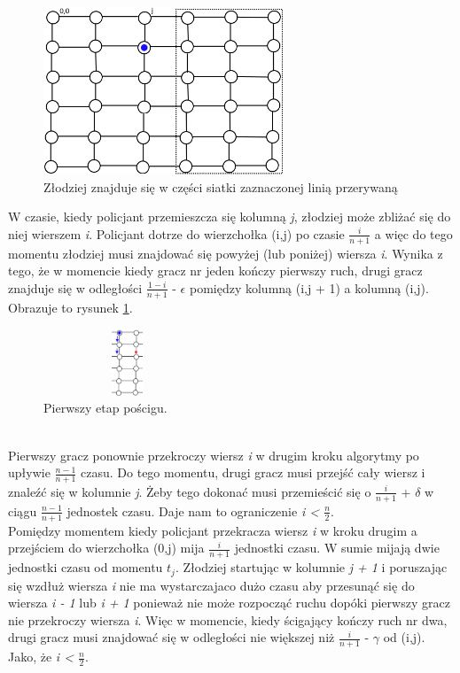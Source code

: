 \documentclass[brudnopis]{xmgr}
\begin{document}
\begin{figure}[ht!]
  \centering
  \includegraphics[height=5cm]{rysunki/podsiatka.png}
  \caption{Złodziej znajduje się w części siatki zaznaczonej linią przerywaną}
\end{figure} 

\indent W czasie, kiedy policjant przemieszcza się kolumną \textit{j}, złodziej może zbliżać się do niej wierszem \textit{i}. Policjant dotrze do wierzchołka (i,j) po czasie $\frac{i}{n+1}$ a więc do tego momentu złodziej musi znajdować się powyżej (lub poniżej) wiersza \textit{i}. Wynika z tego, że w momencie kiedy gracz nr jeden kończy pierwszy ruch, drugi gracz znajduje się w odległości $\frac{1-i}{n+1}$ - $\epsilon$ pomiędzy kolumną (i,j + 1) a kolumną (i,j). Obrazuje to rysunek \ref{fig:pierwszy krok}.
\begin{figure}[ht!]
  \centering
  \includegraphics[width=5cm,height=2cm]{rysunki/poscig_1.png}
  \caption{Pierwszy etap pościgu.}
  \label{fig:pierwszy krok}
\end{figure}
\\\indent Pierwszy gracz ponownie przekroczy wiersz \textit{i} w drugim kroku algorytmy po upływie $\frac{n-1}{n+1}$ czasu. Do tego momentu, drugi gracz musi przejść cały wiersz i znaleźć się w kolumnie \textit{j}. Żeby tego dokonać musi przemieścić się o $\frac{i}{n+1}$ + $\delta$ w ciągu $\frac{n-1}{n+1}$ jednostek czasu. Daje nam to ograniczenie \textit{i < $\frac{n}{2}$}.
\\\indent Pomiędzy momentem kiedy policjant przekracza wiersz \textit{i} w kroku drugim a przejściem do wierzchołka (0,j) mija $\frac{i}{n+1}$ jednostki czasu. W sumie mijają dwie jednostki czasu od momentu $t_j$. Złodziej startując w kolumnie \textit{j + 1} i poruszając się wzdłuż wiersza \textit{i} nie ma wystarczajaco dużo czasu aby przesunąć się do wiersza \textit{i - 1} lub \textit{i + 1} ponieważ nie może rozpocząć ruchu dopóki pierwszy gracz nie przekroczy wiersza \textit{i}. Więc w momencie, kiedy ścigający kończy ruch nr dwa, drugi gracz musi znajdować się w odległości nie większej niż $\frac{i}{n+1}$ - $\gamma$ od (i,j). Jako, że \textit{i < $\frac{n}{2}$}.
\end{document}
